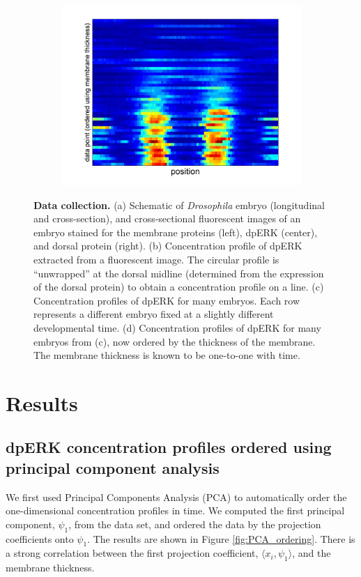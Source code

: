\documentclass[10pt]{article}
\begin{document}
\begin{figure}[H]
\begin{center}
\begin{subfigure}{0.4\textwidth}
\includegraphics[width=\textwidth]{data_ordered_membrane}
\caption{}
\end{subfigure}
\end{center}
\caption{{\bf Data collection.} (a) Schematic of {\em Drosophila} embryo (longitudinal and cross-section), and cross-sectional fluorescent images of an embryo stained for the membrane proteins (left), dpERK (center), and dorsal protein (right).
(b) Concentration profile of dpERK extracted from a fluorescent image. The circular profile is ``unwrapped'' at the dorsal midline (determined from the expression of the dorsal protein) to obtain a concentration profile on a line.
(c) Concentration profiles of dpERK for many embryos. Each row represents a different embryo fixed at a slightly different developmental time.
(d) Concentration profiles of dpERK for many embryos from (c), now ordered by the thickness of the membrane. The membrane thickness is known to be one-to-one with time.}
\label{fig:background}
\end{figure}

\section*{Results}

\subsection*{dpERK concentration profiles ordered using principal component analysis}

We first used Principal Components Analysis (PCA) to automatically order the one-dimensional concentration profiles in time. 
%
We computed the first principal component, $\psi_1$, from the data set, and ordered the data by the projection coefficients onto $\psi_1$. 
%
The results are shown in Figure \ref{fig:PCA_ordering}.
%
There is a strong correlation between the first projection coefficient, $\langle x_i, \psi_1 \rangle$, and the membrane thickness.
\end{document}
